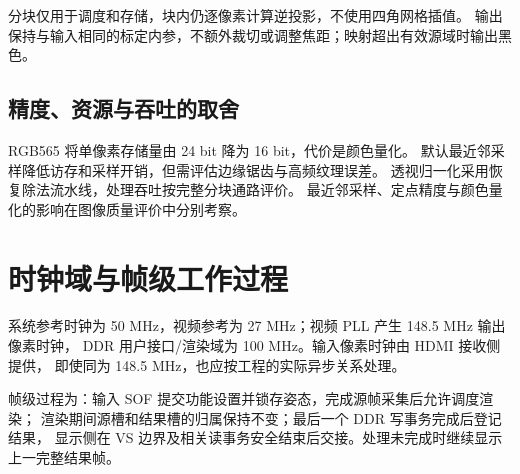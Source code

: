 分块仅用于调度和存储，块内仍逐像素计算逆投影，不使用四角网格插值。
输出保持与输入相同的标定内参，不额外裁切或调整焦距；映射超出有效源域时输出黑色。

\subsection{精度、资源与吞吐的取舍}
RGB565 将单像素存储量由 24 bit 降为 16 bit，代价是颜色量化。
默认最近邻采样降低访存和采样开销，但需评估边缘锯齿与高频纹理误差。
透视归一化采用恢复除法流水线，处理吞吐按完整分块通路评价。
最近邻采样、定点精度与颜色量化的影响在图像质量评价中分别考察。

\section{时钟域与帧级工作过程}
系统参考时钟为 50 MHz，视频参考为 27 MHz；视频 PLL 产生 148.5 MHz 输出像素时钟，
DDR 用户接口/渲染域为 100 MHz。输入像素时钟由 HDMI 接收侧提供，
即使同为 148.5 MHz，也应按工程的实际异步关系处理。

帧级过程为：输入 SOF 提交功能设置并锁存姿态，完成源帧采集后允许调度渲染；
渲染期间源槽和结果槽的归属保持不变；最后一个 DDR 写事务完成后登记结果，
显示侧在 VS 边界及相关读事务安全结束后交接。处理未完成时继续显示上一完整结果帧。
